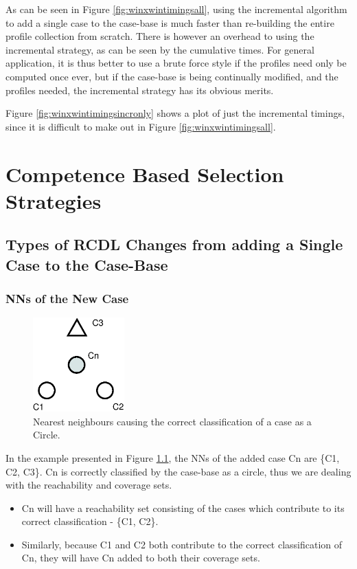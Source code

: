 \documentclass[a4paper,11pt]{report}
\begin{document}
\begin{samepage}
As can be seen in Figure \ref{fig:winxwintimingsall}, using the incremental algorithm to add a single case to the case-base is much faster than re-building the entire profile collection from scratch. There is however an overhead to using the incremental strategy, as can be seen by the cumulative times. For general application, it is thus better to use a brute force style if the profiles need only be computed once ever, but if the case-base is being continually modified, and the profiles needed, the incremental strategy has its obvious merits.

Figure \ref{fig:winxwintimingsincronly} shows a plot of just the incremental timings, since it is difficult to make out in Figure \ref{fig:winxwintimingsall}.
\end{samepage}


\chapter{Competence Based Selection Strategies}
\section{Types of RCDL Changes from adding a Single Case to the Case-Base}
\subsection{NNs of the New Case}
\begin{figure}[h!] 
\centering
	\includegraphics[width=100pt]{./Drawn/NNsCorrectlyClassify}
\caption{Nearest neighbours causing the correct classification of a case as a Circle.}
\label{fig:NNsCorrect}
\end{figure}

In the example presented in Figure \ref{fig:NNsCorrect}, the NNs of the added case Cn are \{C1, C2, C3\}. Cn is correctly classified by the case-base as a circle, thus we are dealing with the reachability and coverage sets.
\begin{itemize}
	\item Cn will have a reachability set consisting of the cases which contribute to its correct classification - \{C1, C2\}.
	\item Similarly, because C1 and C2 both contribute to the correct classification of Cn, they will have Cn added to both their coverage sets.
\end{itemize}
\end{document}
